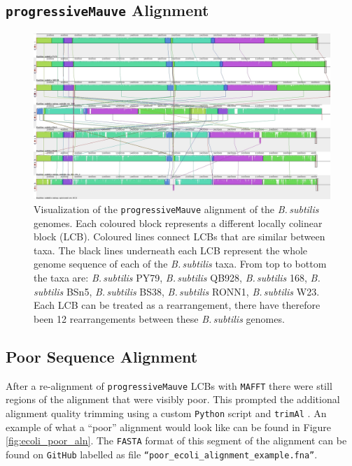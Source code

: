 \documentclass[11pt]{article}
\newcommand{\bass}{\textit{B.\,subtilis}\xspace}
\newcommand{\p}{\texttt{progressiveMauve}\xspace}
\providecommand{\DIFdelend}{} %
\begin{document}
\DIFdelend \subsection{\p Alignment}
\begin{figure}[H]
	\begin{center}
		\includegraphics[width=\textwidth]{./figs/Bacillus_alignment_mauve.jpg}
		\caption{\label{fig:mauvealn} Visualization of the \p alignment of the \bass genomes. Each coloured block represents a different locally colinear block (LCB). Coloured lines connect LCBs that are similar between taxa. The black lines underneath each LCB represent the whole genome sequence of each of the \bass taxa. From top to bottom the taxa are: \bass PY79, \bass QB928, \bass 168, \bass BSn5, \bass BS38, \bass RONN1, \bass W23.  Each LCB can be treated as a rearrangement, there have therefore been 12 rearrangements between these \bass genomes.}
	\end{center}
\end{figure}




\subsection{Poor Sequence Alignment}
After a re-alignment of \p LCBs with \texttt{MAFFT} there were still regions of the alignment that were visibly poor.
This prompted the additional alignment quality trimming using a custom \texttt{Python} script and \texttt{trimAl} \citep{capella2009trimal}.
An example of what a ``poor'' alignment would look like can be found in Figure \ref{fig:ecoli_poor_aln}.
The \texttt{FASTA} format of this segment of the alignment can be found on \texttt{GitHub} labelled as file \texttt{``poor\_ecoli\_alignment\_example.fna''}.
\end{document}
